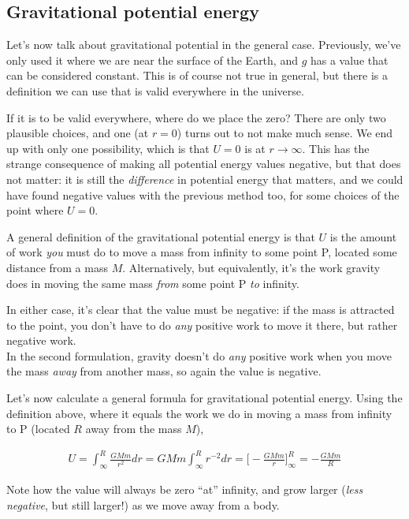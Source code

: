 \documentclass[12pt,a4paper]{report}
\begin{document}
\subsection{Gravitational potential energy}

Let's now talk about gravitational potential in the general case. Previously, we've only used it where we are near the surface of the Earth, and $g$ has a value that can be considered constant. This is of course not true in general, but there is a definition we can use that is valid everywhere in the universe.

If it is to be valid everywhere, where do we place the zero? There are only two plausible choices, and one (at $r = 0$) turns out to not make much sense. We end up with only one possibility, which is that $U = 0$ is at $r \to \infty$. This has the strange consequence of making all potential energy values negative, but that does not matter: it is still the \emph{difference} in potential energy that matters, and we could have found negative values with the previous method too, for some choices of the point where $U = 0$.

A general definition of the gravitational potential energy is that $U$ is the amount of work \emph{you} must do to move a mass from infinity to some point P, located some distance from a mass $M$. Alternatively, but equivalently, it's the work gravity does in moving the same mass \emph{from} some point P \emph{to} infinity.

In either case, it's clear that the value must be negative: if the mass is attracted to the point, you don't have to do \emph{any} positive work to move it there, but rather negative work.\\
In the second formulation, gravity doesn't do \emph{any} positive work when you move the mass \emph{away} from another mass, so again the value is negative.

Let's now calculate a general formula for gravitational potential energy. Using the definition above, where it equals the work we do in moving a mass from infinity to P (located $R$ away from the mass $M$),

\begin{align}
U = \int_\infty^R \frac{G M m}{r^2} dr = G M m \int_\infty^R r^{-2} dr = \Big[-\frac{G M m}{r}\Big]_\infty^R = -\frac{G M m}{R}
\end{align}

Note how the value will always be zero ``at'' infinity, and grow larger (\emph{less negative}, but still larger!) as we move away from a body.
\end{document}
